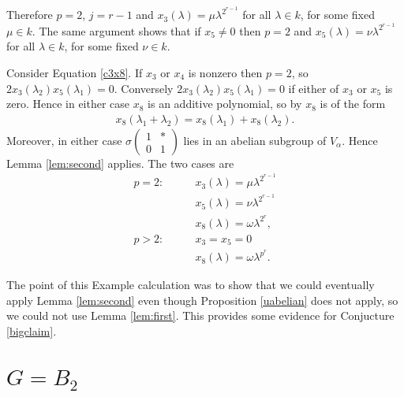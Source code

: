 Therefore $p = 2$, $j=r-1$ and $x_3(\lambda) = \mu \lambda^{2^{r-1}}$ for all $\lambda\in k$, for some fixed $\mu\in k$. The same argument shows that if $x_5 \neq 0$ then $p=2$ and $x_5(\lambda) = \nu \lambda^{2^{r-1}}$ for all $\lambda \in k$, for some fixed $\nu\in k$.

Consider Equation \ref{c3x8}. If $x_3$ or $x_4$ is nonzero then $p=2$, so $2x_3(\lambda_2)x_5(\lambda_1) = 0$. Conversely $2x_3(\lambda_2)x_5(\lambda_1) = 0$ if either of $x_3$ or $x_5$ is zero. Hence in either case $x_8$ is an additive polynomial, so by \cite[\S 20.3, Lemma A]{humphreys1975linear} $x_8$ is of the form
\begin{align*}
	x_8(\lambda_1 + \lambda_2) = x_8(\lambda_1) + x_8(\lambda_2).
\end{align*}
Moreover, in either case $\sigma\left(\begin{matrix}1 & *\\0 & 1\end{matrix}\right)$ lies in an abelian subgroup of $V_\alpha$. Hence Lemma \ref{lem:second} applies. The two cases are
\begin{align*}
p=2: \qquad&x_3(\lambda) = \mu \lambda^{2^{r-1}} \\
	&x_5(\lambda) = \nu \lambda^{2^{r-1}} \\
	&x_8(\lambda) = \omega \lambda^{2^r}, \\
p>2: \qquad&x_3=x_5=0 \\
	&x_8(\lambda) = \omega \lambda^{p^r}.
\end{align*}

The point of this Example calculation was to show that we could eventually apply Lemma \ref{lem:second} even though Proposition \ref{uabelian} does not apply, so we could not use Lemma \ref{lem:first}. This provides some evidence for Conjucture \ref{bigclaim}.



\section{$G = B_2$}
\label{b2}

